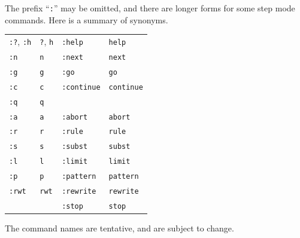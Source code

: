 \documentclass[a4paper]{memoir}
\begin{document}
The prefix ``\verb|:|'' may be omitted, and there are longer forms
for some step mode commands. Here is a summary of synonyms.
\begin{center}
\begin{tabular}{llll}
\verb|:?|, \verb|:h| & \verb|?|, \verb|h| & \verb|:help| & \verb|help| \\
\verb|:n| & \verb|n| & \verb|:next| & \verb|next| \\
\verb|:g| & \verb|g| & \verb|:go| & \verb|go| \\
\verb|:c| & \verb|c| & \verb|:continue| & \verb|continue| \\
\verb|:q| & \verb|q| & & \\
\verb|:a| & \verb|a| & \verb|:abort| & \verb|abort| \\
\verb|:r| & \verb|r| & \verb|:rule| & \verb|rule| \\
\verb|:s| & \verb|s| & \verb|:subst| & \verb|subst| \\
\verb|:l| & \verb|l| & \verb|:limit| & \verb|limit| \\
\verb|:p| & \verb|p| & \verb|:pattern| & \verb|pattern| \\
\verb|:rwt| & \verb|rwt| & \verb|:rewrite| & \verb|rewrite| \\
& & \verb|:stop| & \verb|stop| \\
\end{tabular}
\end{center}

\begin{warning}
  The command names are tentative, and are subject to change.
\end{warning}
\end{document}
